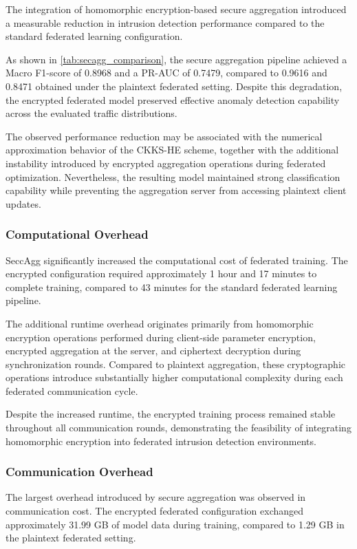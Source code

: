 \documentclass[conference]{IEEEtran}
\begin{document}
The integration of homomorphic encryption-based secure aggregation introduced a measurable reduction in intrusion detection performance compared to the standard federated learning configuration.

As shown in \autoref{tab:secagg_comparison}, the secure aggregation pipeline achieved a Macro F1-score of 0.8968 and a PR-AUC of 0.7479, compared to 0.9616 and 0.8471 obtained under the plaintext federated setting. Despite this degradation, the encrypted federated model preserved effective anomaly detection capability across the evaluated traffic distributions.

The observed performance reduction may be associated with the numerical approximation behavior of the CKKS-HE scheme, together with the additional instability introduced by encrypted aggregation operations during federated optimization. Nevertheless, the resulting model maintained strong classification capability while preventing the aggregation server from accessing plaintext client updates.

\subsubsection{Computational Overhead}

SeccAgg significantly increased the computational cost of federated training. The encrypted configuration required approximately 1 hour and 17 minutes to complete training, compared to 43 minutes for the standard federated learning pipeline.

The additional runtime overhead originates primarily from homomorphic encryption operations performed during client-side parameter encryption, encrypted aggregation at the server, and ciphertext decryption during synchronization rounds. Compared to plaintext aggregation, these cryptographic operations introduce substantially higher computational complexity during each federated communication cycle.

Despite the increased runtime, the encrypted training process remained stable throughout all communication rounds, demonstrating the feasibility of integrating homomorphic encryption into federated intrusion detection environments.

\subsubsection{Communication Overhead}

The largest overhead introduced by secure aggregation was observed in communication cost. The encrypted federated configuration exchanged approximately 31.99 GB of model data during training, compared to 1.29 GB in the plaintext federated setting.
\end{document}
